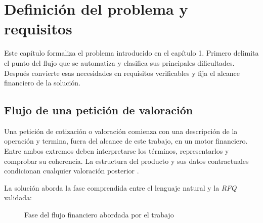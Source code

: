 \chapter{Definición del problema y requisitos}
\label{cap:problema_requisitos}

Este capítulo formaliza el problema introducido en el capítulo 1. Primero delimita el punto del flujo que se automatiza y clasifica sus principales dificultades. Después convierte esas necesidades en requisitos verificables y fija el alcance financiero de la solución.

\section{Flujo de una petición de valoración}
\label{sec:flujo_actual_rfq}

Una petición de cotización o valoración comienza con una descripción de la operación y termina, fuera del alcance de este trabajo, en un motor financiero. Entre ambos extremos deben interpretarse los términos, representarlos y comprobar su coherencia. La estructura del producto y sus datos contractuales condicionan cualquier valoración posterior \citep{hull2021derivatives,isda2023cdm}.

La solución aborda la fase comprendida entre el lenguaje natural y la \textit{RFQ} validada:

\begin{figure}[H]
    \centering
    \caption[Flujo de una petición financiera]{Fase del flujo financiero abordada por el trabajo}
    \label{fig:flujo_actual_rfq}
\end{figure}

